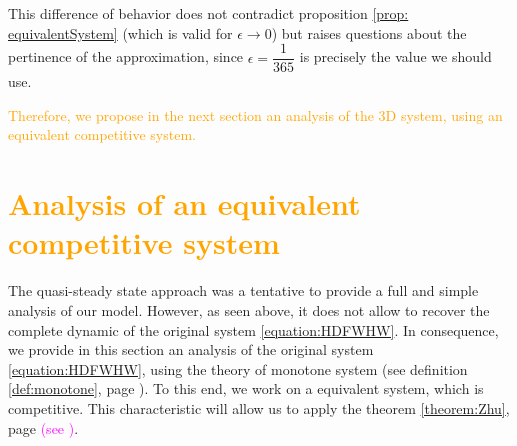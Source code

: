 \documentclass{article}
\newcommand{\YD}[1]{\textcolor{magenta}{#1}}
\newcommand{\vdeux}[1]{\textcolor{orange}{#1}}
\theoremstyle{definition}
\theoremstyle{remark}
\begin{document}
This difference of behavior does not contradict proposition \ref{prop: equivalentSystem} (which is valid for $\epsilon \rightarrow 0$) but raises questions about the pertinence of the approximation, since $\epsilon = \dfrac{1}{365}$ is precisely the value we should use. 

\vdeux{Therefore, we propose in the next section an analysis of the 3D system, using an equivalent competitive system.}

\section{\vdeux{Analysis of an equivalent competitive system}} \label{sec:competitive}
The quasi-steady state approach was a tentative to provide a full and simple analysis of our model. However, as seen above, it does not allow to recover the complete dynamic of the original system \eqref{equation:HDFWHW}. In consequence, we provide in this section an analysis of the original system \eqref{equation:HDFWHW}, using the theory of monotone system (see definition \ref{def:monotone}, page \pageref{def:monotone}). To this end, we work on a equivalent system, which is competitive. This characteristic will allow us to apply the theorem \ref{theorem:Zhu}, page \pageref{theorem:Zhu} \YD{(see \cite{zhu_stable_1994})}.
\end{document}
